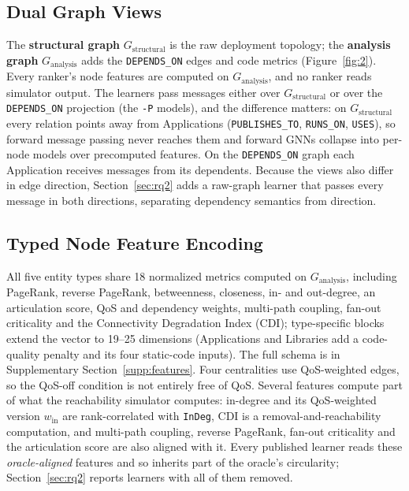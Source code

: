 \documentclass[preprint,3p]{elsarticle}
\begin{document}
\subsection{Dual Graph Views}
\label{sec:3.4}

The \textbf{structural graph} $G_{\text{structural}}$ is the raw deployment topology; the \textbf{analysis graph} $G_{\text{analysis}}$ adds the \texttt{DEPENDS\_ON} edges and code metrics (Figure~\ref{fig:2}). Every ranker's node features are computed on $G_{\text{analysis}}$, and no ranker reads simulator output. The learners pass messages either over $G_{\text{structural}}$ or over the \texttt{DEPENDS\_ON} projection (the \texttt{-P} models), and the difference matters: on $G_{\text{structural}}$ every relation points away from Applications (\texttt{PUBLISHES\_TO}, \texttt{RUNS\_ON}, \texttt{USES}), so forward message passing never reaches them and forward GNNs collapse into per-node models over precomputed features. On the \texttt{DEPENDS\_ON} graph each Application receives messages from its dependents. Because the views also differ in edge direction, Section~\ref{sec:rq2} adds a raw-graph learner that passes every message in both directions, separating dependency semantics from direction.

\subsection{Typed Node Feature Encoding}
\label{sec:3.5}

All five entity types share 18 normalized metrics computed on $G_{\text{analysis}}$, including PageRank, reverse PageRank, betweenness, closeness, in- and out-degree, an articulation score, QoS and dependency weights, multi-path coupling, fan-out criticality and the Connectivity Degradation Index (CDI); type-specific blocks extend the vector to 19--25 dimensions (Applications and Libraries add a code-quality penalty and its four static-code inputs). The full schema is in Supplementary Section~\ref{supp:features}. Four centralities use QoS-weighted edges, so the QoS-off condition is not entirely free of QoS. Several features compute part of what the reachability simulator computes: in-degree and its QoS-weighted version $w_{\text{in}}$ are rank-correlated with \texttt{InDeg}, CDI is a removal-and-reachability computation, and multi-path coupling, reverse PageRank, fan-out criticality and the articulation score are also aligned with it. Every published learner reads these \emph{oracle-aligned} features and so inherits part of the oracle's circularity; Section~\ref{sec:rq2} reports learners with all of them removed.
\end{document}
